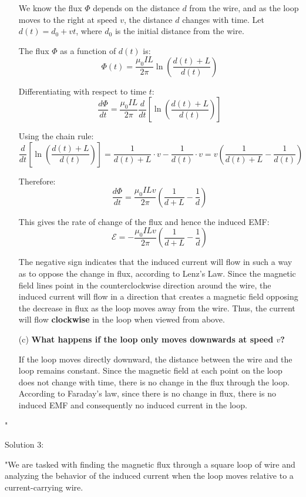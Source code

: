 \begin{enumerate}
    We know the flux $\Phi$ depends on the distance $d$ from the wire, and as the loop moves to the right at speed $v$, the distance $d$ changes with time. Let $d(t) = d_0 + vt$, where $d_0$ is the initial distance from the wire.
    
    The flux $\Phi$ as a function of $d(t)$ is:
    \[
    \Phi(t) = \frac{\mu_0 I L}{2\pi} \ln \left( \frac{d(t) + L}{d(t)} \right)
    \]
    
    Differentiating with respect to time $t$:
    \[
    \frac{d\Phi}{dt} = \frac{\mu_0 I L}{2\pi} \frac{d}{dt} \left[ \ln \left( \frac{d(t) + L}{d(t)} \right) \right]
    \]
    
    Using the chain rule:
    \[
    \frac{d}{dt} \left[ \ln \left( \frac{d(t) + L}{d(t)} \right) \right] = \frac{1}{d(t) + L} \cdot v - \frac{1}{d(t)} \cdot v = v \left( \frac{1}{d(t) + L} - \frac{1}{d(t)} \right)
    \]
    
    Therefore:
    \[
    \frac{d\Phi}{dt} = \frac{\mu_0 I L v}{2\pi} \left( \frac{1}{d + L} - \frac{1}{d} \right)
    \]
    
    This gives the rate of change of the flux and hence the induced EMF:
    \[
    \mathcal{E} = - \frac{\mu_0 I L v}{2\pi} \left( \frac{1}{d + L} - \frac{1}{d} \right)
    \]
    
    The negative sign indicates that the induced current will flow in such a way as to oppose the change in flux, according to Lenz's Law. Since the magnetic field lines point in the counterclockwise direction around the wire, the induced current will flow in a direction that creates a magnetic field opposing the decrease in flux as the loop moves away from the wire. Thus, the current will flow \textbf{clockwise} in the loop when viewed from above.

    \item[(c)] \textbf{What happens if the loop only moves downwards at speed $v$?}
    
    If the loop moves directly downward, the distance between the wire and the loop remains constant. Since the magnetic field at each point on the loop does not change with time, there is no change in the flux through the loop. According to Faraday’s law, since there is no change in flux, there is no induced EMF and consequently no induced current in the loop.
\end{enumerate}"

Solution 3: 

"We are tasked with finding the magnetic flux through a square loop of wire and analyzing the behavior of the induced current when the loop moves relative to a current-carrying wire.


